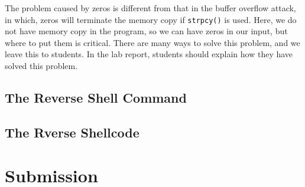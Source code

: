 The problem caused by zeros is different from that
in the buffer overflow attack, in which,
zeros will terminate the memory copy if \texttt{strpcy()} is used. 
Here, we do not have memory copy in the program, 
so we can have zeros in our input, but where to put them
is critical. 
There are many ways to solve this problem, and 
we leave this to students. In the lab report, students
should explain how they have solved this problem. 



\subsection{The Reverse Shell Command} 
\label{fmt:rev_shellcmd}




\subsection{The Rverse Shellcode} 
\label{fmt:rev_shellcode}


 

\section{Submission}






